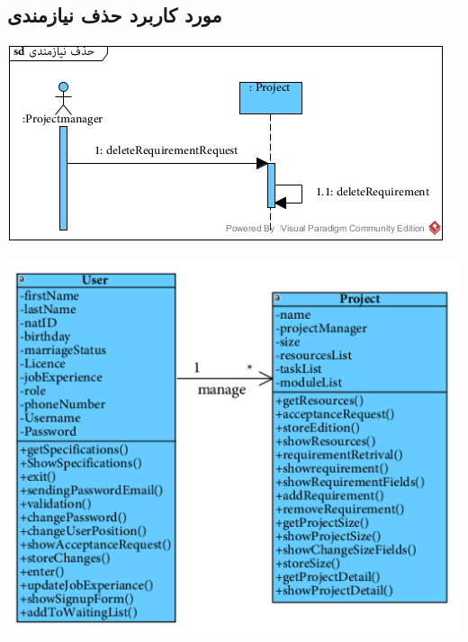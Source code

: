 \newpage
\vspace{2cm}
\subsection*{مورد کاربرد حذف نیازمندی}
\vspace{2cm}
\begin{center}
\includegraphics[width=\textwidth]{SequenceDiagrams/25.jpg}
\end{center}

\newpage
\vspace{2cm}
\begin{center}
\includegraphics[width=\textwidth]{SequenceClasses/25.png}
\end{center}

\newpage
\vspace{2cm}
